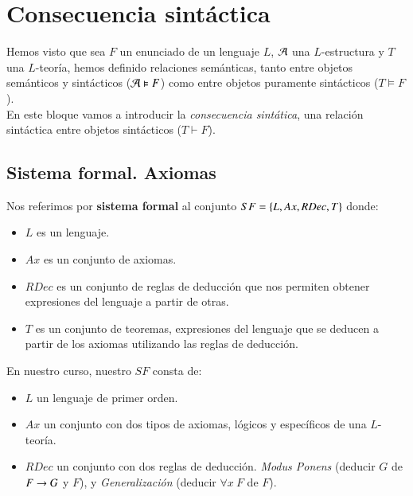
\chapter{Consecuencia sintáctica}

Hemos visto que sea $F$ un enunciado de un lenguaje $L$, $\mathcal{A}$ una $L$-estructura y $T$ una $L$-teoría, hemos definido relaciones semánticas, tanto entre objetos semánticos y sintácticos ($\mathcal{A} \vDash F$) como entre objetos puramente sintácticos ($T \vDash F$).\\
En este bloque vamos a introducir la \textit{consecuencia sintática}, una relación sintáctica entre objetos sintácticos ($T \vdash F$).

\section{Sistema formal. Axiomas}
\begin{dfn}
    Nos referimos por \textbf{sistema formal} al conjunto $SF = \left\{L, Ax, RDec, T\right\}$ donde:
    \begin{itemize}
        \item $L$ es un lenguaje.
        \item $Ax$ es un conjunto de axiomas.
        \item $RDec$ es un conjunto de reglas de deducción que nos permiten obtener expresiones del lenguaje a partir de otras.
        \item $T$ es un conjunto de teoremas, expresiones del lenguaje que se deducen a partir de los axiomas utilizando las reglas de deducción.
    \end{itemize}
\end{dfn}

En nuestro curso, nuestro $SF$ consta de:
\begin{itemize}
    \item $L$ un lenguaje de primer orden.
    \item $Ax$ un conjunto con dos tipos de axiomas, lógicos y específicos de una $L$-teoría.
    \item $RDec$ un conjunto con dos reglas de deducción. \textit{Modus Ponens} (deducir $G$ de $F \rightarrow G$ y $F$), y \textit{Generalización} (deducir $\forall x\ F$ de $F$).
\end{itemize}

